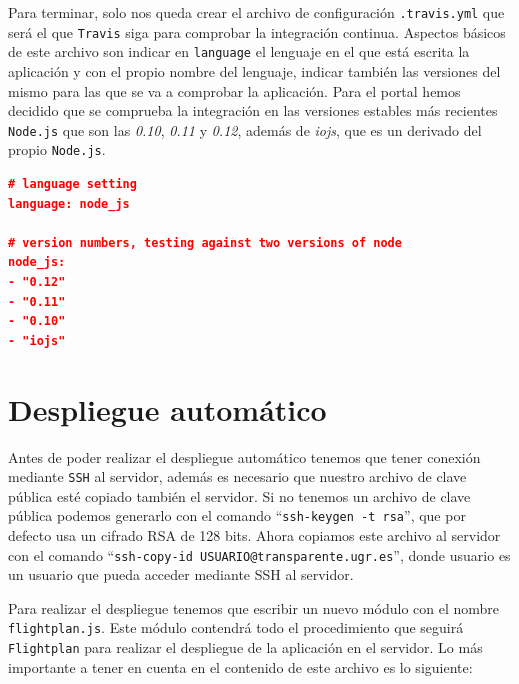 Para terminar, solo nos queda crear el archivo de configuración {\tt .travis.yml} que será el que {\tt Travis} siga para comprobar la integración continua. Aspectos básicos de este archivo son indicar en {\tt language} el lenguaje en el que está escrita la aplicación y con el propio nombre del lenguaje, indicar también las versiones del mismo para las que se va a comprobar la aplicación. Para el portal hemos decidido que se comprueba la integración en las versiones estables más recientes {\tt Node.js} que son las \textit{0.10}, \textit{0.11} y \textit{0.12}, además de \textit{iojs}, que es un derivado del propio {\tt Node.js}.

\begin{lstlisting}[language=json,caption={Archivo JSON con informacion de personal},label={lst:json_personal}]
# language setting
language: node_js

# version numbers, testing against two versions of node
node_js:
- "0.12"
- "0.11"
- "0.10"
- "iojs"
\end{lstlisting}

\section{Despliegue automático}

Antes de poder realizar el despliegue automático tenemos que tener conexión mediante {\tt SSH} al servidor, además es necesario que nuestro archivo de clave pública esté copiado también el servidor. Si no tenemos un archivo de clave pública podemos generarlo con el comando ``{\tt ssh-keygen -t rsa}'', que por defecto usa un cifrado RSA de 128 bits. Ahora copiamos este archivo al servidor con el comando ``{\tt ssh-copy-id USUARIO@transparente.ugr.es}'', donde usuario es un usuario que pueda acceder mediante SSH al servidor.

\bigskip

Para realizar el despliegue tenemos que escribir un nuevo módulo con el nombre {\tt flightplan.js}. Este módulo contendrá todo el procedimiento que seguirá {\tt Flightplan} para realizar el despliegue de la aplicación en el servidor. Lo más importante a tener en cuenta en el contenido de este archivo es lo siguiente:

